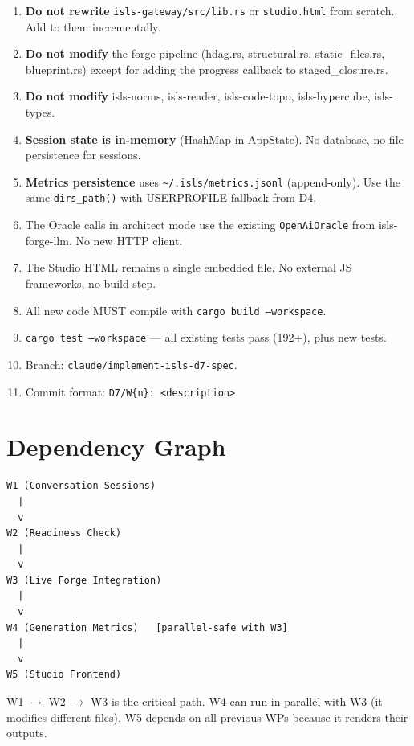 \documentclass[11pt,a4paper]{article}
\begin{document}
\begin{enumerate}
\item \textbf{Do not rewrite} \texttt{isls-gateway/src/lib.rs} or 
      \texttt{studio.html} from scratch. Add to them incrementally.
\item \textbf{Do not modify} the forge pipeline (hdag.rs, 
      structural.rs, static\_files.rs, blueprint.rs) except for 
      adding the progress callback to staged\_closure.rs.
\item \textbf{Do not modify} isls-norms, isls-reader, isls-code-topo, 
      isls-hypercube, isls-types.
\item \textbf{Session state is in-memory} (HashMap in AppState). 
      No database, no file persistence for sessions.
\item \textbf{Metrics persistence} uses 
      \texttt{\textasciitilde/.isls/metrics.jsonl} (append-only).
      Use the same \texttt{dirs\_path()} with USERPROFILE fallback 
      from D4.
\item The Oracle calls in architect mode use the existing 
      \texttt{OpenAiOracle} from isls-forge-llm. No new HTTP 
      client.
\item The Studio HTML remains a single embedded file. No external 
      JS frameworks, no build step.
\item All new code MUST compile with \texttt{cargo build --workspace}.
\item \texttt{cargo test --workspace} --- all existing tests pass 
      (192+), plus new tests.
\item Branch: \texttt{claude/implement-isls-d7-spec}.
\item Commit format: \texttt{D7/W\{n\}: <description>}.
\end{enumerate}


\section{Dependency Graph}

\begin{verbatim}
W1 (Conversation Sessions)
  |
  v
W2 (Readiness Check)
  |
  v
W3 (Live Forge Integration)
  |
  v
W4 (Generation Metrics)   [parallel-safe with W3]
  |
  v
W5 (Studio Frontend)
\end{verbatim}

W1 $\to$ W2 $\to$ W3 is the critical path. W4 can run in parallel 
with W3 (it modifies different files). W5 depends on all previous 
WPs because it renders their outputs.
\end{document}
